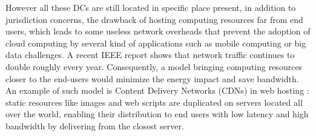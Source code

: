 However all these DCs are still located in specific place present, in addition 
to jurisdiction concerns, the drawback of hosting computing resources far from 
end users, which leads to some useless network overheads that prevent the 
adoption of cloud computing by several kind of applications such as mobile 
computing or big data challenges. A recent IEEE report \cite{ieeenetreport:2012}
shows that network traffic continues to double roughly every year. Consequently,
a model bringing computing resources closer to the end-users would minimize the 
energy impact and save bandwidth. An example of such model is Content Delivery 
Networks (CDNs) in web hosting : static resources like images and web scripts 
are duplicated on servers located all over the world, enabling their 
distribution to end users with low latency and high bandwidth by delivering from
the closest server.

